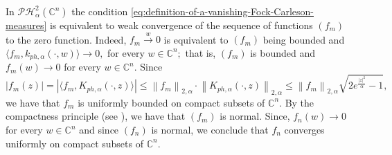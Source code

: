 \documentclass[10pt,leqno]{amsart}
\newtheorem{lemma}[theorem]{Lemma}
\newtheorem{corollary}[theorem]{Corollary}
\theoremstyle{remark}
\numberwithin{equation}{section}
\newcommand{\hph}{\mathcal{PH}_\alpha^2(\mathbb{C}^n)}%
\newcommand{\Kph}{K_{ph,\alpha}}%
\newcommand{\kph}{k_{ph,\alpha}}%
\begin{document}
In $\hph$ the condition \eqref{eq:definition-of-a-vanishing-Fock-Carleson-measures} is equivalent to weak convergence of the sequence of functions $(f_m)$ to the zero function. Indeed, $f_m \stackrel{w}{\to} 0$ is equivalent to $(f_m)$ being bounded and $\langle f_m,\kph(\cdot,w) \rangle\to 0,$ for every $w \in \mathbb{C}^{n};$ that is,  $\left( f_m \right) $ is bounded and $f_m(w)\to 0$ for every $w \in \mathbb{C}^{n}.$
Since
\[
	\left| f_m(z) \right| =\left| \langle f_m,\Kph(\cdot,z) \rangle \right|  \leq \left\lVert f_m \right\rVert_{2,\alpha}\cdot \left\lVert \Kph(\cdot,z) \right\rVert_{2,\alpha} \leq \left\lVert f_m \right\rVert_{2,\alpha} \sqrt{ 2e^{\frac{|z|^2}{\alpha}}-1} ,
\]
we have that $f_m$ is uniformly bounded on compact subsets of $\mathbb{C}^{n}.$ By the compactness principle (see \cite[Thm 2.2.11]{klimekPluripotentialTheory1991}), we have that $(f_m)$ is normal. Since, $f_n(w) \to 0$ for every $w \in \mathbb{C}^{n}$ and since $(f_n)$ is normal, we conclude that $f_n$ converges uniformly on compact subsets of $\mathbb{C}^{n}$.
\end{document}
